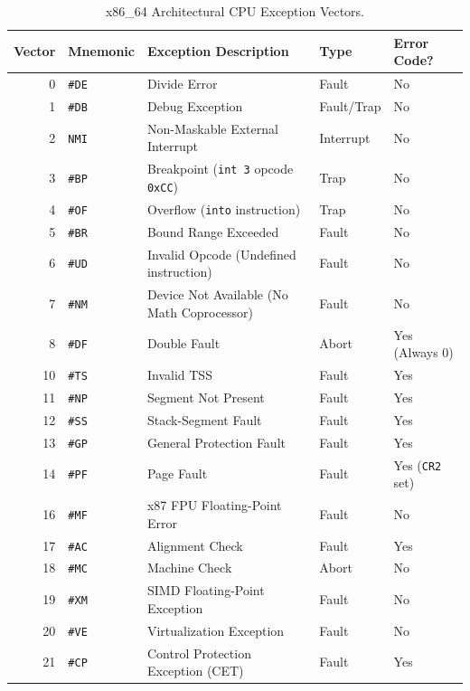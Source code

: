 \begin{table}[htbp]
\centering
\small
\begin{tabular}{rllll}
\toprule
\textbf{Vector} & \textbf{Mnemonic} & \textbf{Exception Description} & \textbf{Type} & \textbf{Error Code?} \\
\midrule
0 & \texttt{\#DE} & Divide Error & Fault & No \\
1 & \texttt{\#DB} & Debug Exception & Fault/Trap & No \\
2 & \texttt{NMI} & Non-Maskable External Interrupt & Interrupt & No \\
3 & \texttt{\#BP} & Breakpoint (\texttt{int 3} opcode \texttt{0xCC}) & Trap & No \\
4 & \texttt{\#OF} & Overflow (\texttt{into} instruction) & Trap & No \\
5 & \texttt{\#BR} & Bound Range Exceeded & Fault & No \\
6 & \texttt{\#UD} & Invalid Opcode (Undefined instruction) & Fault & No \\
7 & \texttt{\#NM} & Device Not Available (No Math Coprocessor) & Fault & No \\
8 & \texttt{\#DF} & Double Fault & Abort & Yes (Always 0) \\
10 & \texttt{\#TS} & Invalid TSS & Fault & Yes \\
11 & \texttt{\#NP} & Segment Not Present & Fault & Yes \\
12 & \texttt{\#SS} & Stack-Segment Fault & Fault & Yes \\
13 & \texttt{\#GP} & General Protection Fault & Fault & Yes \\
14 & \texttt{\#PF} & Page Fault & Fault & Yes (\texttt{CR2} set) \\
16 & \texttt{\#MF} & x87 FPU Floating-Point Error & Fault & No \\
17 & \texttt{\#AC} & Alignment Check & Fault & Yes \\
18 & \texttt{\#MC} & Machine Check & Abort & No \\
19 & \texttt{\#XM} & SIMD Floating-Point Exception & Fault & No \\
20 & \texttt{\#VE} & Virtualization Exception & Fault & No \\
21 & \texttt{\#CP} & Control Protection Exception (CET) & Fault & Yes \\
\bottomrule
\end{tabular}
\caption{x86\_64 Architectural CPU Exception Vectors.}
\label{tab:exception_vectors}
\end{table}

